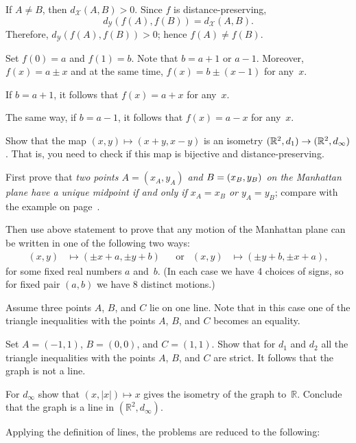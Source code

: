 If $A\ne B$, then $d_\mathcal{X}(A,B)>0$.
Since $f$ is distance-preserving,
$$d_\mathcal{Y}(f(A),f(B))=d_\mathcal{X}(A,B).$$
Therefore, $d_\mathcal{Y}(f(A),f(B))>0$; hence $f(A)\ne f(B)$.

Set $f(0)=a$ and $f(1)=b$.
Note that $b=a+1$ or $a-1$.
Moreover, $f(x)=a\pm x$ and at the same time, $f(x)=b\pm(x-1)$ for any~$x$.

If $b=a+1$, 
it follows that 
$f(x)=a+x$ for any~$x$.

The same way, if $b=a-1$, 
it follows that 
$f(x)=a-x$ for any~$x$.

Show that the map $(x,y)\mapsto (x+y,x-y)$ is an isometry  $(\mathbb{R}^2,d_1)\z\to (\mathbb{R}^2,d_\infty)$.
That is, you need to check if this map is bijective and distance-preserving.

First prove that \textit{two points $A=(x_A,y_A)$ and $B\z=(x_B,y_B)$ on the Manhattan plane have a unique midpoint if and only if $x_A=x_B$ or $y_A=y_B$}; compare with the example on page~\pageref{example:isometric but not congruent}. 

Then use above statement to prove that
any motion of the Manhattan plane 
can be written in one of the following two ways:
\begin{align*}
(x,y)&\mapsto (\pm x+a,\pm y+b)
&&\text{or} 
&(x,y)&\mapsto (\pm y+b,\pm x+a),
\end{align*}
for some fixed real numbers $a$ and~$b$.
(In each case we have 4 choices of signs, so for fixed pair $(a,b)$ we have 8 distinct motions.)

Assume three points $A$, $B$, and $C$ lie on one line.
Note that in this case one of the triangle inequalities with the points $A$, $B$, and $C$ becomes an equality.

Set $A=(-1,1)$, $B=(0,0)$, and $C=(1,1)$.
Show that for $d_1$ and $d_2$
all the triangle inequalities with the points $A$, $B$, and $C$ are strict.
It follows that the graph is not a line.

For $d_\infty$ show that $(x,|x|)\mapsto x$ gives the isometry of the graph to~$\mathbb{R}$.
Conclude that the graph is a line in $(\mathbb{R}^2,d_\infty)$.

Applying the definition of lines,
the problems are reduced to the following:

